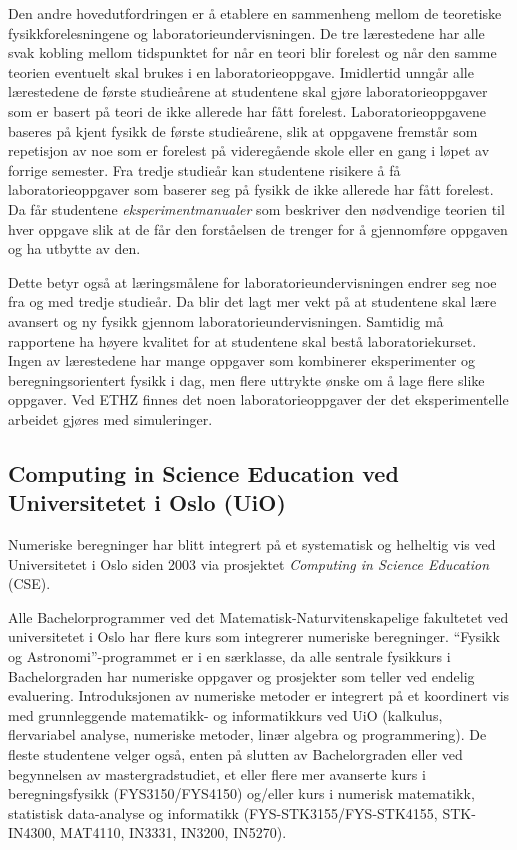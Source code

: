 \documentclass{article}
\begin{document}
Den andre hovedutfordringen er å etablere en sammenheng mellom de teoretiske fysikkforelesningene og laboratorieundervisningen. De tre lærestedene har alle svak kobling mellom tidspunktet for når en teori blir forelest og når den samme teorien eventuelt skal brukes i en laboratorieoppgave. Imidlertid unngår alle lærestedene de første studieårene at studentene skal gjøre laboratorieoppgaver som er basert på teori de ikke allerede har fått forelest. Laboratorieoppgavene baseres på kjent fysikk de første studieårene, slik at oppgavene fremstår som repetisjon av noe som er forelest på videregående skole eller en gang i løpet av forrige semester. Fra tredje studieår kan studentene risikere å få laboratorieoppgaver som baserer seg på fysikk de ikke allerede har fått forelest. Da får studentene \emph{eksperimentmanualer} som beskriver den nødvendige teorien til hver oppgave slik at de får den forståelsen de trenger for å gjennomføre oppgaven og ha utbytte av den.

Dette betyr også at læringsmålene for laboratorieundervisningen endrer seg noe fra og med tredje studieår. Da blir det lagt mer vekt på at studentene skal lære avansert og ny fysikk gjennom laboratorieundervisningen. Samtidig må rapportene ha høyere kvalitet for at studentene skal bestå laboratoriekurset. Ingen av lærestedene har mange oppgaver som kombinerer eksperimenter og beregningsorientert fysikk i dag, men flere uttrykte ønske om å lage flere slike oppgaver. Ved ETHZ finnes det noen laboratorieoppgaver der det eksperimentelle arbeidet gjøres med simuleringer.

\subsection{Computing in Science Education ved Universitetet i Oslo (UiO)}
Numeriske beregninger har blitt integrert på et systematisk og helheltig vis ved Universitetet i Oslo siden 2003 via prosjektet \emph{Computing in Science Education} (CSE).

Alle Bachelorprogrammer ved det Matematisk-Naturvitenskapelige fakultetet ved universitetet i Oslo har flere kurs som integrerer numeriske beregninger. ``Fysikk og Astronomi''-programmet er i en særklasse, da alle sentrale fysikkurs i Bachelorgraden har numeriske oppgaver og prosjekter som teller ved endelig evaluering. Introduksjonen av numeriske metoder er integrert på et koordinert vis med grunnleggende matematikk- og informatikkurs ved UiO (kalkulus, flervariabel analyse, numeriske metoder, linær algebra og programmering). De fleste studentene velger også, enten på slutten av Bachelorgraden eller ved begynnelsen av mastergradstudiet, et eller flere mer avanserte kurs i beregningsfysikk (FYS3150/FYS4150) og/eller kurs i numerisk matematikk, statistisk data-analyse og informatikk (FYS-STK3155/FYS-STK4155, STK-IN4300, MAT4110, IN3331, IN3200, IN5270).
\end{document}
